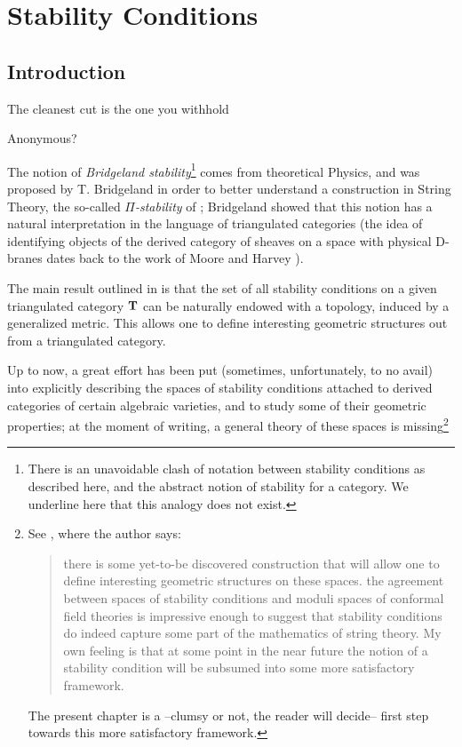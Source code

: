 \chapter{Stability Conditions}\label{chap:stabilities}
\thispagestyle{empty}
\def\semi{\angle\!}
\newcommand{\thin}{\asymp}
\def\cab{\CC_{[a,b)}}
\def\R{\mathbb{R}}
\def\eps{\varepsilon}
\def\sl{\text{\japanese{切}}}
\section{Introduction}
\epigraph{The cleanest cut is the one you withhold}{Anonymous?}
The notion of \emph{Bridgeland stability}\footnote{There is an unavoidable clash of notation between stability conditions as described here, and the abstract notion of stability for a category. We underline here that this analogy does not exist.} comes from theoretical Physics, and was proposed by T\@. Bridgeland in order to better understand a construction in String Theory, the so\hyp{}called \emph{$\Pi$\hyp{}stability} of \cite{douglas2002dirichlet,douglas2001d}; Bridgeland showed that this notion has a natural interpretation in the language of triangulated categories (the idea of identifying objects of the derived category of sheaves on a space with physical D\hyp{}branes dates back to the work of Moore and Harvey \cite{harvey1998algebras}). 

The main result outlined in \cite{Brid,Bridge2} is that the set of all stability conditions on a given triangulated category $\mathbf{T}$ can be naturally endowed with a topology, induced by a generalized metric. This allows one to define interesting geometric structures out from a triangulated category.

Up to now, a great effort has been put (sometimes, unfortunately, to no avail) into explicitly describing the spaces of stability conditions attached to derived categories of certain algebraic varieties, and to study some of their geometric properties; at the moment of writing, a general theory of these spaces is missing\footnote{See \cite{Bridge2}, where the author says:
\begin{quote}
there is some yet\hyp{}to\hyp{}be discovered construction that will allow one to define interesting geometric structures on these spaces. \omissis the agreement between spaces of stability conditions and moduli spaces of conformal field theories is impressive enough to suggest that stability conditions do indeed capture some part
of the mathematics of string theory. My own feeling is that at some point in the near future the notion of a stability condition will be subsumed into some more satisfactory framework.
\end{quote}
The present chapter is a --clumsy or not, the reader will decide-- first step towards this more satisfactory framework.}

